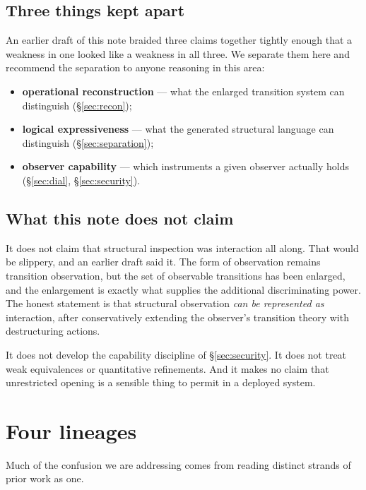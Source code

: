 \documentclass[11pt]{article}
\theoremstyle{plain}
\theoremstyle{definition}
\begin{document}
\subsection{Three things kept apart}

An earlier draft of this note braided three claims together tightly enough that a weakness in one
looked like a weakness in all three. We separate them here and recommend the separation to anyone
reasoning in this area:

\begin{itemize}
\item \textbf{operational reconstruction} --- what the enlarged transition system can distinguish
(\S\ref{sec:recon});
\item \textbf{logical expressiveness} --- what the generated structural language can distinguish
(\S\ref{sec:separation});
\item \textbf{observer capability} --- which instruments a given observer actually holds
(\S\ref{sec:dial}, \S\ref{sec:security}).
\end{itemize}

\subsection{What this note does not claim}

It does not claim that structural inspection was interaction all along. That would be slippery, and an
earlier draft said it. The form of observation remains transition observation, but the set of
observable transitions has been enlarged, and the enlargement is exactly what supplies the additional
discriminating power. The honest statement is that structural observation \emph{can be represented as}
interaction, after conservatively extending the observer's transition theory with destructuring
actions.

It does not develop the capability discipline of \S\ref{sec:security}. It does not treat weak
equivalences or quantitative refinements. And it makes no claim that unrestricted opening is a sensible
thing to permit in a deployed system.

\section{Four lineages}
\label{sec:lineages}

Much of the confusion we are addressing comes from reading distinct strands of prior work as one.
\end{document}
